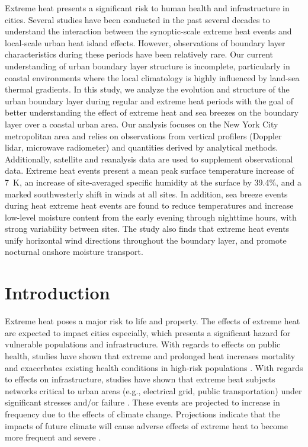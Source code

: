 \documentclass[num-refs]{wiley-article}
\begin{document}
Extreme heat presents a significant risk to human health and infrastructure in cities. Several studies have been conducted in the past several decades to understand the interaction between the synoptic-scale extreme heat events and local-scale urban heat island effects. However, observations of boundary layer characteristics during these periods have been relatively rare. Our current understanding of urban boundary layer structure is incomplete, particularly in coastal environments where the local climatology is highly influenced by land-sea thermal gradients. In this study, we analyze the evolution and structure of the urban boundary layer during regular and extreme heat periods with the goal of better understanding the effect of extreme heat and sea breezes on the boundary layer over a coastal urban area. Our analysis focuses on the New York City metropolitan area and relies on observations from vertical profilers (Doppler lidar, microwave radiometer) and quantities derived by analytical methods. Additionally, satellite and reanalysis data are used to supplement observational data. Extreme heat events present a mean peak surface temperature increase of \SI{7}{\kelvin}, an increase of site-averaged specific humidity at the surface by 39.4\%, and a marked southwesterly shift in winds at all sites. In addition, sea breeze events during heat extreme heat events are found to reduce temperatures and increase low-level moisture content from the early evening through nighttime hours, with strong variability between sites. The study also finds that extreme heat events unify horizontal wind directions throughout the boundary layer, and promote nocturnal onshore moisture transport. 

\section{Introduction}

Extreme heat poses a major risk to life and property. The effects of extreme heat are expected to impact cities especially, which presents a significant hazard for vulnerable populations and infrastructure. With regards to effects on public health, studies have shown that extreme and prolonged heat increases mortality and exacerbates existing health conditions in high-risk populations \citep{anderson2011, frumkin2016, heaviside2017, madrigano2015}. With regards to effects on infrastructure, studies have shown that extreme heat subjects networks critical to urban areas (e.g., electrical grid, public transportation) under significant stresses and/or failure \citep{mcevoy2012, zuo2015}. These events are projected to increase in frequency due to the effects of climate change. Projections indicate that the impacts of future climate will cause adverse effects of extreme heat to become more frequent and severe \citep{burillo2019, forzieri2018, peng2011}.
\end{document}

